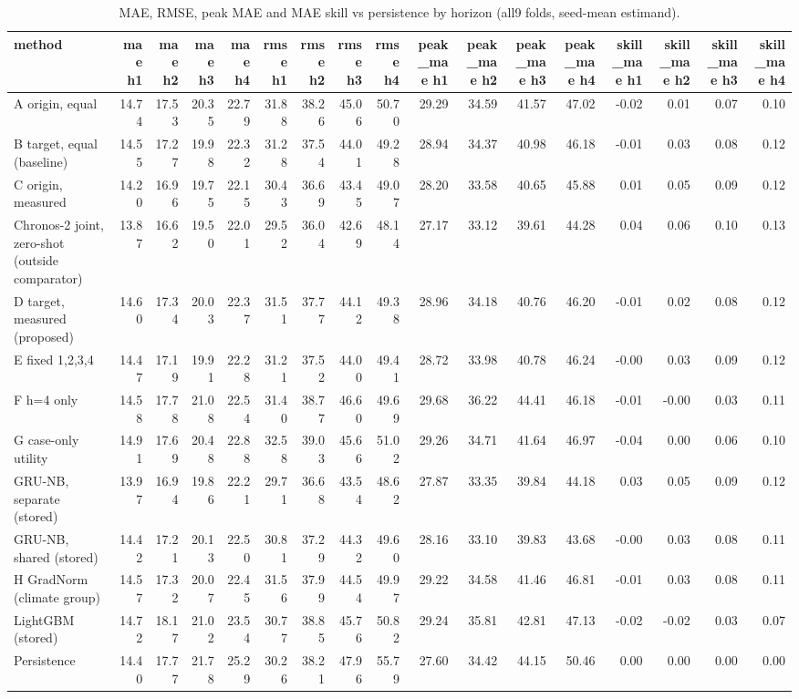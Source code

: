 \begin{table}[t]
\centering
\small
\caption{MAE, RMSE, peak MAE and MAE skill vs persistence by horizon (all9 folds, seed-mean estimand).}
\label{tab:metrics-all9-seed-mean}
\begin{tabular}{lrrrrrrrrrrrrrrrr}
\toprule
method & mae h1 & mae h2 & mae h3 & mae h4 & rmse h1 & rmse h2 & rmse h3 & rmse h4 & peak\_mae h1 & peak\_mae h2 & peak\_mae h3 & peak\_mae h4 & skill\_mae h1 & skill\_mae h2 & skill\_mae h3 & skill\_mae h4 \\
\midrule
A origin, equal & 14.74 & 17.53 & 20.35 & 22.79 & 31.88 & 38.26 & 45.06 & 50.70 & 29.29 & 34.59 & 41.57 & 47.02 & -0.02 & 0.01 & 0.07 & 0.10 \\
B target, equal (baseline) & 14.55 & 17.27 & 19.98 & 22.32 & 31.28 & 37.54 & 44.01 & 49.28 & 28.94 & 34.37 & 40.98 & 46.18 & -0.01 & 0.03 & 0.08 & 0.12 \\
C origin, measured & 14.20 & 16.96 & 19.75 & 22.15 & 30.43 & 36.69 & 43.45 & 49.07 & 28.20 & 33.58 & 40.65 & 45.88 & 0.01 & 0.05 & 0.09 & 0.12 \\
Chronos-2 joint, zero-shot (outside comparator) & 13.87 & 16.62 & 19.50 & 22.01 & 29.52 & 36.04 & 42.69 & 48.14 & 27.17 & 33.12 & 39.61 & 44.28 & 0.04 & 0.06 & 0.10 & 0.13 \\
D target, measured (proposed) & 14.60 & 17.34 & 20.03 & 22.37 & 31.51 & 37.77 & 44.12 & 49.38 & 28.96 & 34.18 & 40.76 & 46.20 & -0.01 & 0.02 & 0.08 & 0.12 \\
E fixed 1,2,3,4 & 14.47 & 17.19 & 19.91 & 22.28 & 31.21 & 37.52 & 44.00 & 49.41 & 28.72 & 33.98 & 40.78 & 46.24 & -0.00 & 0.03 & 0.09 & 0.12 \\
F h=4 only & 14.58 & 17.78 & 21.08 & 22.54 & 31.40 & 38.77 & 46.60 & 49.69 & 29.68 & 36.22 & 44.41 & 46.18 & -0.01 & -0.00 & 0.03 & 0.11 \\
G case-only utility & 14.91 & 17.69 & 20.48 & 22.88 & 32.58 & 39.03 & 45.66 & 51.02 & 29.26 & 34.71 & 41.64 & 46.97 & -0.04 & 0.00 & 0.06 & 0.10 \\
GRU-NB, separate (stored) & 13.97 & 16.94 & 19.86 & 22.21 & 29.71 & 36.68 & 43.54 & 48.62 & 27.87 & 33.35 & 39.84 & 44.18 & 0.03 & 0.05 & 0.09 & 0.12 \\
GRU-NB, shared (stored) & 14.42 & 17.21 & 20.13 & 22.50 & 30.81 & 37.29 & 44.32 & 49.60 & 28.16 & 33.10 & 39.83 & 43.68 & -0.00 & 0.03 & 0.08 & 0.11 \\
H GradNorm (climate group) & 14.57 & 17.32 & 20.07 & 22.45 & 31.56 & 37.99 & 44.54 & 49.97 & 29.22 & 34.58 & 41.46 & 46.81 & -0.01 & 0.03 & 0.08 & 0.11 \\
LightGBM (stored) & 14.72 & 18.17 & 21.02 & 23.54 & 30.77 & 38.85 & 45.76 & 50.82 & 29.24 & 35.81 & 42.81 & 47.13 & -0.02 & -0.02 & 0.03 & 0.07 \\
Persistence & 14.40 & 17.77 & 21.78 & 25.29 & 30.26 & 38.21 & 47.96 & 55.79 & 27.60 & 34.42 & 44.15 & 50.46 & 0.00 & 0.00 & 0.00 & 0.00 \\
\bottomrule
\end{tabular}
\end{table}
